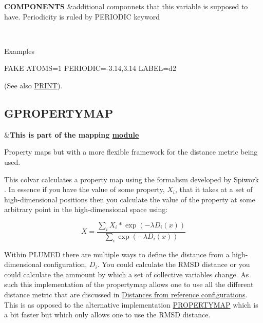 \begin{TabularC}{2}
\hline
{\bfseries  C\+O\+M\+P\+O\+N\+E\+N\+T\+S } &additional componnets that this variable is supposed to have. Periodicity is ruled by P\+E\+R\+I\+O\+D\+I\+C keyword  

\\
\end{TabularC}


\begin{DoxyParagraph}{Examples}

\end{DoxyParagraph}
\begin{DoxyVerb}FAKE ATOMS=1 PERIODIC=-3.14,3.14   LABEL=d2
\end{DoxyVerb}
 (See also \hyperlink{PRINT}{P\+R\+I\+N\+T}). \hypertarget{GPROPERTYMAP}{}\subsection{G\+P\+R\+O\+P\+E\+R\+T\+Y\+M\+A\+P}\label{GPROPERTYMAP}
\begin{TabularC}{2}
\hline
&{\bfseries  This is part of the mapping \hyperlink{mymodules}{module }}   \\
\end{TabularC}
Property maps but with a more flexible framework for the distance metric being used.

This colvar calculates a property map using the formalism developed by Spiwork \cite{Spiwok:2011ce}. In essence if you have the value of some property, $X_i$, that it takes at a set of high-\/dimensional positions then you calculate the value of the property at some arbitrary point in the high-\/dimensional space using\+:

\[ X=\frac{\sum_i X_i*\exp(-\lambda D_i(x))}{\sum_i \exp(-\lambda D_i(x))} \]

Within P\+L\+U\+M\+E\+D there are multiple ways to define the distance from a high-\/dimensional configuration, $D_i$. You could calculate the R\+M\+S\+D distance or you could calculate the ammount by which a set of collective variables change. As such this implementation of the propertymap allows one to use all the different distance metric that are discussed in \hyperlink{dists}{Distances from reference configurations}. This is as opposed to the alternative implementation \hyperlink{PROPERTYMAP}{P\+R\+O\+P\+E\+R\+T\+Y\+M\+A\+P} which is a bit faster but which only allows one to use the R\+M\+S\+D distance.

